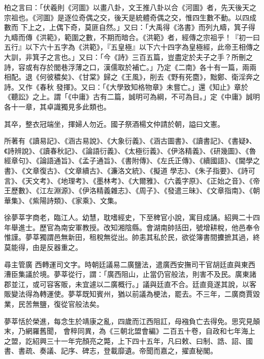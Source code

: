 \begin{pinyinscope}
 柏之言曰：「伏羲則《河圖》以畫八卦，文王推八卦以合《河圖》者，先天後天之宗祖也。《河圖》是逐位奇偶之交，後天是統體奇偶之交，惟四生數不動。以四成數而
 下上之，上偶下奇，莫匪自然。」又曰：「大禹得《洛書》而列九疇，箕子得九疇而傳《洪範》，範圍之數，不期而暗合。《洪範》者，經傳之宗祖乎！『初一曰五行』以下六十五字為《洪範》，『五皇極』以下六十四字為皇極經，此帝王相傳之大訓，非箕子之言也。」又曰：「今《詩》三百五篇，豈盡定於夫子之手？所刪之詩，容或有存於閭巷浮薄之口，漢儒取於補亡。」乃定《二南》各十有一篇，兩兩相配。退《何彼穠矣》、《甘棠》歸之《王風》，削去《野有死麕》，黜鄭、衛淫奔之詩。又作《春秋
 發揮》。又曰：「《大學致知格物章》未嘗亡。」還《知止》章於《聽訟》之上。謂「《中庸》古有二篇，誠明可為綱，不可為目。」定《中庸》誠明各十一章，其卓識獨見多此類也。



 其卒，整衣冠端坐，揮婦人勿近。國子祭酒楊文仲請於朝，謚曰文憲。



 所著有《讀易記》、《涵古易說》、《大象衍義》、《涵古圖書》、《讀書記》、《書疑》、《詩辨說》、《讀春秋記》、《論語衍義》、《太極衍義》、《伊洛精義》、《研幾圖》、《魯經章句》、《論語通旨》、《孟子通旨》、《書附傳》、《左氏正傳》、《續國語》、《閫學之書》、《文章復古》、《文章續古》、《濂洛文統》、《擬道
 學志》、《朱子指要》、《詩可言》、《天文考》、《地理考》、《墨林考》、《大爾雅》、《六義字原》、《正始之音》、《帝王歷數》、《江左淵源》、《伊洛精義雜志》、《周子》、《發遣三昧》、《文章指南》、《朝華集》、《紫陽詩類》、《家乘》、文集。



 徐夢莘字商老，臨江人。幼慧，耽嗜經史，下至稗官小說，寓目成誦。紹興二十四年舉進士。歷官為南安軍教授。改知湘陰縣。會湖南帥括田，號增耕稅，他邑奉令惟謹。夢莘獨謂邑無新田，租稅無從出。帥恚其私於民，欲從簿書間攈摭其過，終莫能得，由是反器重之。



 尋主管廣
 西轉運司文字。時朝廷議易二廣鹽法，遣廣西安撫司干官胡廷直與東西漕臣集議於境。夢莘從行，謂：「廣西阻山，止當仍官般法，則害不及民。廣東諸郡並江，或可容客販，未宜遽以二廣概行。」議與廷直不合。廷直竟遂其說，以客販變法得為轉運使。夢莘既知賓州，猶以前議為梗法，罷去。不三年，二廣商賈毀業，民苦無鹽，復從官般法矣。



 夢莘恬於榮進，每念生於靖康之亂，四歲而江西阻訌，母襁負亡去得免。思究見顛末，乃網羅舊聞，
 會稡同異，為《三朝北盟會編》二百五十卷，自政和七年海上之盟，訖紹興三十一年完顏亮之斃，上下四十五年，凡曰敕、曰制、誥、詔、國書、書疏、奏議、記序、碑志，登載靡遺。帝聞而嘉之，擢直秘閣。




\end{pinyinscope}
